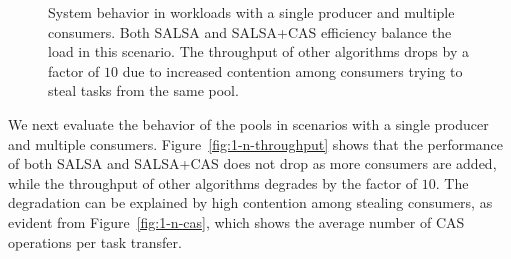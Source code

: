 \begin{figure}[htb]
	\centering
  \vspace{-10pt}
	\caption{\footnotesize{System behavior in workloads with a single producer and multiple consumers. 
	Both SALSA and SALSA+CAS efficiency balance the load in this scenario. The throughput of other algorithms drops by a factor of $10$ due to increased contention among consumers trying to steal tasks from the same pool.}}
	\vspace{-5pt}
	\label{fig:1-n-perf}
\end{figure}

We next evaluate the behavior of the pools in scenarios with a single producer and multiple consumers. 
Figure~\ref{fig:1-n-throughput} shows that the performance of both SALSA and SALSA+CAS does not drop as more consumers are added, while the throughput of other algorithms degrades by the factor of $10$. 
The degradation can be explained by high contention among stealing consumers, as evident from Figure~\ref{fig:1-n-cas}, which shows the average number of CAS operations per task transfer. %

